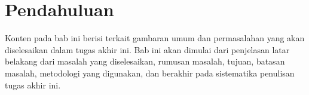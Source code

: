 \chapter{Pendahuluan}

Konten pada bab ini berisi terkait gambaran umum dan permasalahan yang akan diselesaikan dalam tugas akhir ini. Bab ini akan dimulai dari penjelasan latar belakang dari masalah yang diselesaikan, rumusan masalah, tujuan, batasan masalah, metodologi yang digunakan, dan berakhir pada sistematika penulisan tugas akhir ini.











